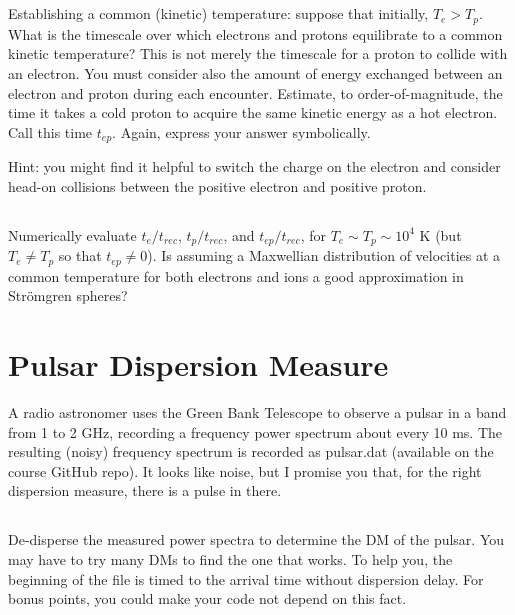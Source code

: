 \documentclass[11pt]{article}
\def\Te{{T_e}}
\def\Tp{{T_p}}
\def\tep{{t_{ep}}}
\def\trec{{t_{rec}}}
\begin{document}
\subsection{}\label{p3partc}

Establishing a common (kinetic) temperature: suppose that initially, $\Te>\Tp$.
What is the timescale over which electrons and protons equilibrate to a
common kinetic temperature? This is not merely the timescale for a proton to
collide with an electron. You must consider also the amount of energy exchanged
between an electron and proton during each encounter. Estimate, to
order-of-magnitude, the time it takes a cold proton to acquire the same kinetic
energy as a hot electron. Call this time $\tep$. Again, express your answer
symbolically.

Hint: you might find it helpful to switch the charge on the electron and
consider head-on collisions between the positive electron and positive proton.

\subsection{}\label{p3partd}

Numerically evaluate $t_e/\trec$, $t_p/\trec$, and $\tep/\trec$, for $\Te\sim\Tp\sim 10^4$ K
(but $\Te\ne\Tp$ so that $\tep\ne 0$). Is assuming a Maxwellian distribution of
velocities at a common temperature for both electrons and ions a good
approximation in Str\"omgren spheres?


\section{Pulsar Dispersion Measure}

A radio astronomer uses the Green Bank Telescope to observe a pulsar
in a band from 1 to 2 GHz, recording a frequency power spectrum about every 10 ms.  The resulting
(noisy) frequency spectrum is recorded as pulsar.dat (available on the course GitHub repo).  It looks like
noise, but
I promise you that, for the right dispersion measure, there is a pulse in there.

\subsection{}
De-disperse the measured power spectra to determine the
DM of the pulsar.  You may have to try many DMs to find the one that works.
To help you, the beginning of the file is timed to the arrival time without dispersion delay.  For bonus
points, you could make your code not depend on this fact.
\end{document}
